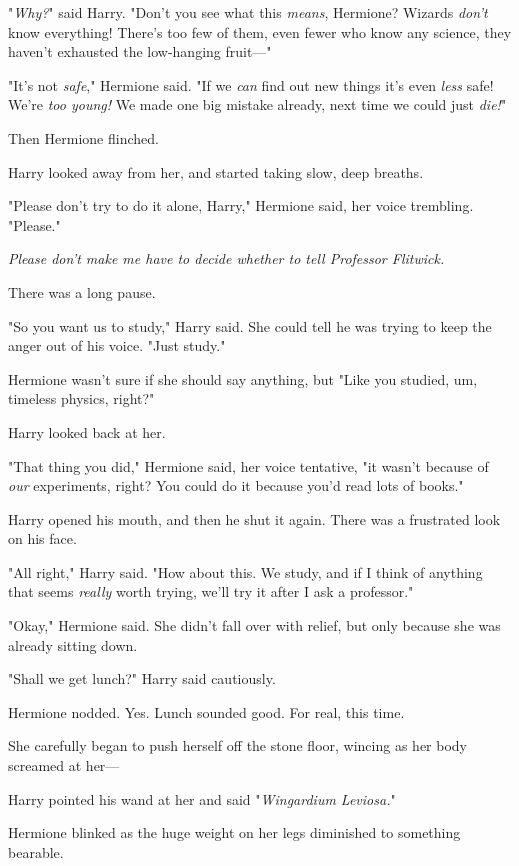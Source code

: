 "\emph{Why?}" said Harry. "Don't you see what this \emph{means}, Hermione?
Wizards \emph{don't} know everything! There's too few of them, even fewer who
know any science, they haven't exhausted the low-hanging fruit\mbox{---}"

"It's not \emph{safe}," Hermione said. "If we \emph{can} find out new things
it's even \emph{less} safe! We're \emph{too young!} We made one big mistake
already, next time we could just \emph{die!}"

Then Hermione flinched.

Harry looked away from her, and started taking slow, deep breaths.

"Please don't try to do it alone, Harry," Hermione said, her voice trembling.
"Please."

\emph{Please don't make me have to decide whether to tell Professor Flitwick.}

There was a long pause.

"So you want us to study," Harry said. She could tell he was trying to keep the
anger out of his voice. "Just study."

Hermione wasn't sure if she should say anything, but{\el} "Like you studied,
um, timeless physics, right?"

Harry looked back at her.

"That thing you did," Hermione said, her voice tentative, "it wasn't because of
\emph{our} experiments, right? You could do it because you'd read lots of
books."

Harry opened his mouth, and then he shut it again. There was a frustrated look
on his face.

"All right," Harry said. "How about this. We study, and if I think of anything
that seems \emph{really} worth trying, we'll try it after I ask a professor."

"Okay," Hermione said. She didn't fall over with relief, but only because she
was already sitting down.

"Shall we get lunch?" Harry said cautiously.

Hermione nodded. Yes. Lunch sounded good. For real, this time.

She carefully began to push herself off the stone floor, wincing as her body
screamed at her\mbox{---}

Harry pointed his wand at her and said "\emph{Wingardium Leviosa.}"

Hermione blinked as the huge weight on her legs diminished to something
bearable.

